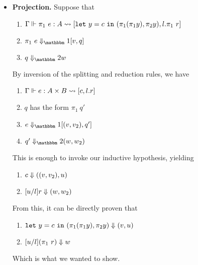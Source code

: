 \documentclass{article}
\begin{document}
\begin{itemize}
\item {\bf Projection.} Suppose that
\begin{enumerate}
\item ${\Gamma} \Vdash {\pi_1~e}:{A} \rightsquigarrow \left[{{\tt let}~{y} = {c}~{\tt in}~{(\pi_1(\pi_1 y),\pi_2 y)},l.\pi_1~r}\right]$
\item $\rsone{\pi_1~e}{v}{q}$
\item $\reducetwo{q}{w}$
\end{enumerate}
By inversion of the splitting and reduction rules, we have
\begin{enumerate}
\item ${\Gamma} \Vdash {e}:{A \times B} \rightsquigarrow \left[{c,l.r}\right]$
\item $q$ has the form $\pi_1~q'$
\item $\rsone{e}{\valprod{v}{v_2}}{q'}$
\item $\reducetwo{q'}{\valprod{w}{w_2}}$
\end{enumerate}
This is enough to invoke our inductive hypothesis, yielding
\begin{enumerate}
\item ${c} \Downarrow {({({v},{v_2})},{u})}$
\item ${[u/l]r} \Downarrow {({w},{w_2})}$
\end{enumerate}
From this, it can be directly proven that
\begin{enumerate}
\item ${{\tt let}~{y} = {c}~{\tt in}~{(\pi_1(\pi_1 y),\pi_2 y)}} \Downarrow {({v},{u})}$
\item ${[u/l](\pi_1~r)} \Downarrow {w}$
\end{enumerate}
Which is what we wanted to show.


\end{itemize}
\end{document}
